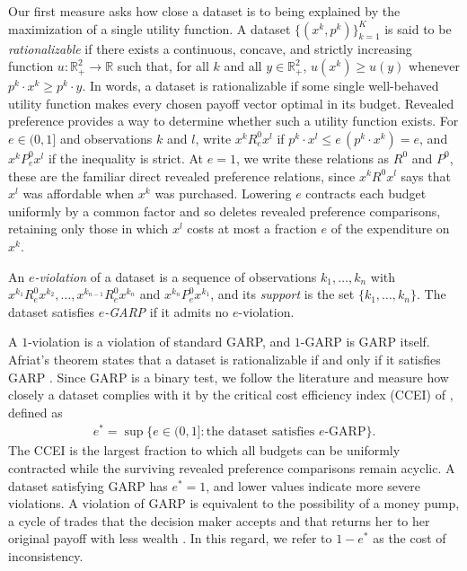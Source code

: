 \documentclass[11 pt]{article}
\begin{document}
Our first measure asks how close a dataset is to being explained by the maximization of a single utility function. A dataset $\{ (x^{k}, p^{k}) \}_{k=1}^{K}$ is said to be \emph{rationalizable} if there exists a continuous, concave, and strictly increasing function $u : \mathbb{R}^2_{+} \to \mathbb{R}$ such that, for all $k$ and all $y \in \mathbb{R}^2_{+}$, $u(x^{k}) \geq u(y) $ whenever $p^{k} \cdot x^{k} \geq p^{k} \cdot y$. In words, a dataset is rationalizable if some single well-behaved utility function makes every chosen payoff vector optimal in its budget. Revealed preference provides a way to determine whether such a utility function exists. For $e \in (0,1]$ and observations $k$ and $l$, write $x^{k} \mathrel{R^{0}_{e}} x^{l}$ if $p^{k} \cdot x^{l} \leq e \, (p^{k} \cdot x^{k}) = e$, and $x^{k} \mathrel{P^{0}_{e}} x^{l}$ if the inequality is strict. At $e = 1$, we write these relations as $R^{0}$ and $P^{0}$, these are the familiar direct revealed preference relations, since $x^{k} \mathrel{R^{0}} x^{l}$ says that $x^{l}$ was affordable when $x^{k}$ was purchased. Lowering $e$ contracts each budget uniformly by a common factor and so deletes revealed preference comparisons, retaining only those in which $x^{l}$ costs at most a fraction $e$ of the expenditure on $x^{k}$.

\begin{definition}\label{def:eviol}\normalfont
An \emph{$e$-violation} of a dataset is a sequence of observations $k_1, \dots, k_n$ with $x^{k_1} \mathrel{R^{0}_{e}} x^{k_2}, \dots, x^{k_{n-1}} \mathrel{R^{0}_{e}} x^{k_n}$ and $x^{k_n} \mathrel{P^{0}_{e}} x^{k_1}$, and its \emph{support} is the set $\{k_1, \dots, k_n\}$. The dataset satisfies \emph{$e$-GARP} if it admits no $e$-violation.
\end{definition}

A $1$-violation is a violation of standard GARP, and $1$-GARP is GARP itself. Afriat's theorem states that a dataset is rationalizable if and only if it satisfies GARP \citep{Afriat:1967:IER, varian1982nonparametric}. Since GARP is a binary test, we follow the literature and measure how closely a dataset complies with it by the critical cost efficiency index (CCEI) of \citet{afriat1972efficiency}, defined as 
\begin{align*}
e^{*} = \sup\bigl\{ e \in (0,1] : \text{the dataset satisfies } e\text{-GARP} \bigr\}.
\end{align*}
The CCEI is the largest fraction to which all budgets can be uniformly contracted while the surviving revealed preference comparisons remain acyclic. A dataset satisfying GARP has $e^{*} = 1$, and lower values indicate more severe violations. A violation of GARP is equivalent to the possibility of a money pump, a cycle of trades that the decision maker accepts and that returns her to her original payoff with less wealth \citep{echenique2011money}. In this regard, we refer to $1 - e^{*}$ as the cost of inconsistency. 
\end{document}
